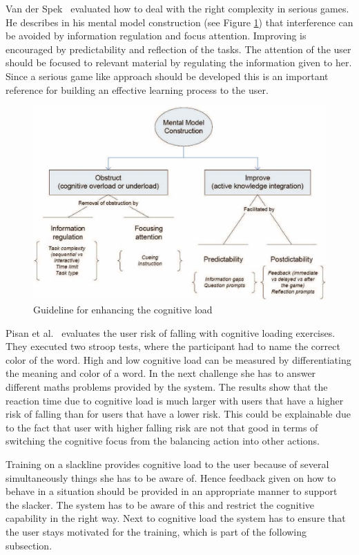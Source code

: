Van der Spek~\cite{Van_der_Spek2010-fe} evaluated how to deal with the right complexity in serious games. He describes in his mental model construction (see Figure \ref{fig:mentalModelConstruction}) that interference can be avoided by information regulation and focus attention. Improving is encouraged by predictability and reflection of the tasks. The attention of the user should be focused to relevant material by regulating the information given to her. Since a serious game like approach should be developed this is an important reference for building an effective learning process to the user.
\begin{figure}[htb]
	\centering
	\begin{minipage}[t]{1\linewidth}
		\centering
		\includegraphics[width=0.74\linewidth]{Pictures/mentalModelConstruction}
		\caption{Guideline for enhancing the cognitive load~\cite{Van_der_Spek2010-fe}}
		\label{fig:mentalModelConstruction}
	\end{minipage}
\end{figure}

Pisan et al.~\cite{Pisan2013-sf} evaluates the user risk of falling with cognitive loading exercises. They executed two stroop tests, where the participant had to name the correct color of the word. High and low cognitive load can be measured by differentiating the meaning and color of a word. In the next challenge she has to answer different maths problems provided by the system. The results show that the reaction time due to cognitive load is much larger with users that have a higher risk of falling than for users that have a lower risk. This could be explainable due to the fact that user with higher falling risk are not that good in terms of switching the cognitive focus from the balancing action into other actions. 

Training on a slackline provides cognitive load to the user because of several simultaneously things she has to be aware of. Hence feedback given on how to behave in a situation should be provided in an appropriate manner to support the slacker. The system has to be aware of this and restrict the cognitive capability in the right way. Next to cognitive load the system has to ensure that the user stays motivated for the training, which is part of the following subsection.

